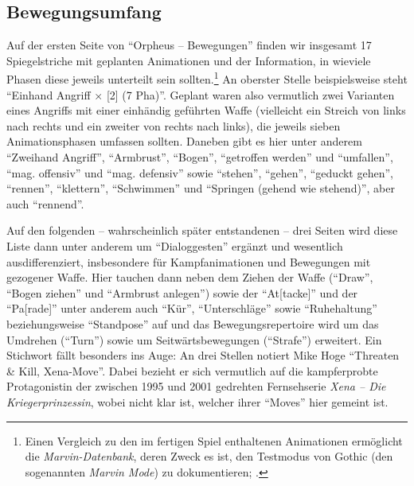 \documentclass[a5paper,pagesize,numbers=noenddot]{scrbook}
\begin{document}
\subsection{Bewegungsumfang}\label{sec:orpheus_darstellung_bewegungsumfang}
Auf der ersten Seite von \enquote{Orpheus -- Bewegungen} finden wir insgesamt 17 Spiegelstriche mit geplanten Animationen und der Information, in wieviele Phasen diese jeweils unterteilt sein sollten.\footnote{Einen Vergleich zu den im fertigen Spiel enthaltenen Animationen ermöglicht die \textit{Marvin-Datenbank}, deren Zweck es ist, den Testmodus von Gothic (den sogenannten \textit{Marvin Mode}) zu dokumentieren; \autocite[vgl.][]{sillus_marvin_2020}.}
An oberster Stelle beispielsweise steht \enquote{Einhand Angriff $\times$ [2] (7 Pha)}.
Geplant waren also vermutlich zwei Varianten eines Angriffs mit einer einhändig geführten Waffe (vielleicht ein Streich von links nach rechts und ein zweiter von rechts nach links), die jeweils sieben Animationsphasen umfassen sollten.
Daneben gibt es hier unter anderem \enquote{Zweihand Angriff}, \enquote{Armbrust}, \enquote{Bogen}, \enquote{getroffen werden} und \enquote{umfallen}, \enquote{mag. offensiv} und \enquote{mag. defensiv} sowie \enquote{stehen}, \enquote{gehen}, \enquote{geduckt gehen}, \enquote{rennen}, \enquote{klettern}, \enquote{Schwimmen} und \enquote{Springen (gehend wie stehend)}, aber auch \enquote{rennend}.\autocite[S.~1]{orpheus_bewegungen}

Auf den folgenden -- wahrscheinlich später entstandenen -- drei Seiten wird diese Liste dann unter anderem um \enquote{Dialoggesten}\autocite[S.~4]{orpheus_bewegungen} ergänzt und wesentlich ausdifferenziert, insbesondere für Kampfanimationen und Bewegungen mit gezogener Waffe.
Hier tauchen dann neben dem Ziehen der Waffe (\enquote{Draw},\autocite[S.~2]{orpheus_bewegungen} \enquote{Bogen ziehen} und \enquote{Armbrust anlegen}\autocite[S.~4]{orpheus_bewegungen}) sowie der \enquote{At[tacke]} und der \enquote{Pa[rade]} unter anderem auch \enquote{Kür}, \enquote{Unterschläge} sowie \enquote{Ruhehaltung} beziehungsweise \enquote{Standpose}\autocite[S.~2]{orpheus_bewegungen} auf und das Bewegungsrepertoire wird um das Umdrehen (\enquote{Turn}) sowie um Seitwärtsbewegungen (\enquote{Strafe}) erweitert.\autocite[S.~3]{orpheus_bewegungen}
Ein Stichwort fällt besonders ins Auge:
An drei Stellen notiert Mike Hoge \enquote{Threaten \& Kill, Xena-Move}.\autocite[S.~2]{orpheus_bewegungen}
Dabei bezieht er sich vermutlich auf die kampferprobte Protagonistin der zwischen 1995 und 2001 gedrehten Fernsehserie \textit{Xena -- Die Kriegerprinzessin}, wobei nicht klar ist, welcher ihrer \enquote{Moves} hier gemeint ist. %
\end{document}
